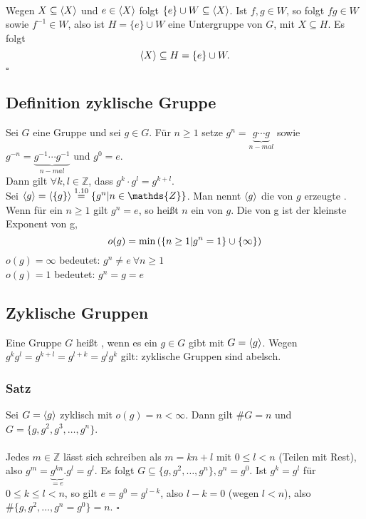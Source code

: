 \\
Wegen $X\subseteq \langle X \rangle$ und $e\in \langle X \rangle$ folgt $\{e\}\cup W\subseteq \langle X \rangle$. 
Ist $f,g\in W$, so folgt $fg\in W$ sowie $f^{-1}\in W$, also ist $H=\{e\}\cup W$ eine Untergruppe von $G$, mit $X\subseteq H$. 
Es folgt 
\[
\langle X \rangle\subseteq H=\{e\}\cup W.
\]
\hfill $\square$

\subsection{Definition zyklische Gruppe}
\label{sub:def_zyklische_gruppen}
Sei $G$ eine Gruppe und sei $g\in G$. 
Für $n\ge 1$ setze $g^n=\underbrace{g\cdots g}_{n-mal}$ sowie $g^{-n}=\underbrace{g^{-1}\cdots g^{-1}}_{n-mal}$ und $g^0=e$.\\
Dann gilt $\forall k,l\in \mathds{Z}$, dass $g^k\cdot g^l = g^{k+l}$.\\
Sei $\lh{g}=\lh{\{g\}}\stackrel{1.10}{=}\{g^n | n\in \mathds{Z}\}$. 
Man nennt $\langle g \rangle$ die von $g$ erzeugte . 
Wenn für ein $n\ge 1$ gilt $g^n=e$, so heißt $n$ ein  von $g$. 
Die  von g ist der kleinste Exponent von g,
\[
o(g)=\min\left( \{n\ge 1 | g^n=1\}\cup \{\infty\}\right)
\]
$o(g)=\infty$ bedeutet: $g^n\not= e~\forall n\ge 1$\\
$o(g)=1$ bedeutet: $g^n=g=e$

\subsection{Zyklische Gruppen}
\label{sub:zyklische_gruppen}
Eine Gruppe $G$ heißt , wenn es ein $g\in G$ gibt mit $G=\langle g \rangle$. 
Wegen $g^kg^l=g^{k+l}=g^{l+k}=g^lg^k$ gilt: zyklische Gruppen sind abelsch.

\subsubsection*{Satz}
Sei $G=\langle g \rangle$ zyklisch mit $o(g)=n<\infty$. 
Dann gilt $\#G=n$ und $G=\{g,g^2,g^3,\dots,g^n\}$.\\

\\
Jedes $m\in \mathds{Z}$ lässt sich schreiben als $m=kn+l$ mit $0\le l<n$ (Teilen mit Rest), also $g^m= \underbrace{g^{kn}}_{=e}.g^l=g^l$. 
Es folgt $G\subseteq \{g,g^2,\dots,g^n\}, g^n=g^0$.
Ist $g^k=g^l$ für $0\le k\le l<n$, so gilt $e=g^0=g^{l-k}$, also $l-k=0$ (wegen $l<n$), also $\#\{g,g^2,\dots,g^n=g^0\}=n$.
\hfill $\square$

